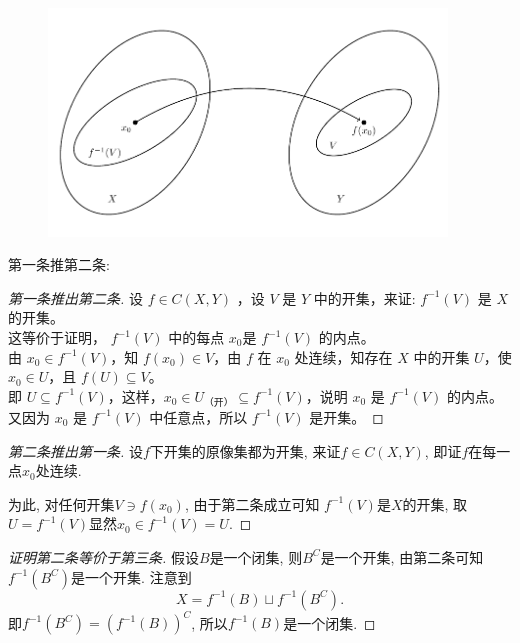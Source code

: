 \begin{figure}[htbp]
    \centering
    \includegraphics[width = 300pt]{figure_连续性.pdf}
    \caption{}
    \label{}
\end{figure}


第一条推第二条: 
\begin{proof}[第一条推出第二条]
    设 $f \in C(X,Y )$ ，设 $V $ 是 $Y $ 中的开集，来证: $f^{-1}(V)$ 是 $X $ 的开集。\\
    这等价于证明， $f ^{-1} (V)$ 中的每点 $x_0$是 $f^{-1}(V)$ 的内点。\\
    由 $x_0 \in f^{-1}(V)$，知 $f(x_0) \in V$，由 $f $ 在 $x_0$ 处连续，知存在 $X$ 中的开集 $U$，使 $x_0 \in U$，且 $f(U) \subseteq V$。\\  
    即 $U \subseteq f^{-1}(V)$，这样，$x_0 \in U_{\text{（开）}} \subseteq f^{-1}(V)$，说明 $x_0$ 是 $f^{-1}(V)$ 的内点。\\
    又因为 $x_0$ 是 $f^{-1}(V)$ 中任意点，所以 $f^{-1}(V)$ 是开集。
\end{proof}


% 
% 
% 
% 
% 
% 
% 
\begin{proof}[第二条推出第一条]
    设$f$下开集的原像集都为开集, 来证$f \in C\left( X,Y \right) $, 即证$f$在每一点$x_0$处连续. 
    
    为此, 对任何开集$V \ni f\left( x_0 \right) $, 由于第二条成立可知 $f^{-1}\left( V \right) $是$X$的开集, 取$U = f^{-1} \left( V \right)$显然$x_0 \in f^{-1} \left( V \right)  = U$.
\end{proof}

\begin{proof}[证明第二条等价于第三条]
    假设$B$是一个闭集, 则$B^{C}$是一个开集, 由第二条可知$f^{-1} \left( B^{C} \right) $是一个开集. 注意到
    \begin{equation}
      X = f^{-1} \left( B \right) \sqcup f^{-1} \left( B^{C} \right) .
    \end{equation}
    即$ f^{-1} \left( B^{C} \right) = \left( f^{-1} \left( B \right)  \right) ^{C}$,
    所以$f^{-1} \left( B \right) $是一个闭集.
\end{proof}

